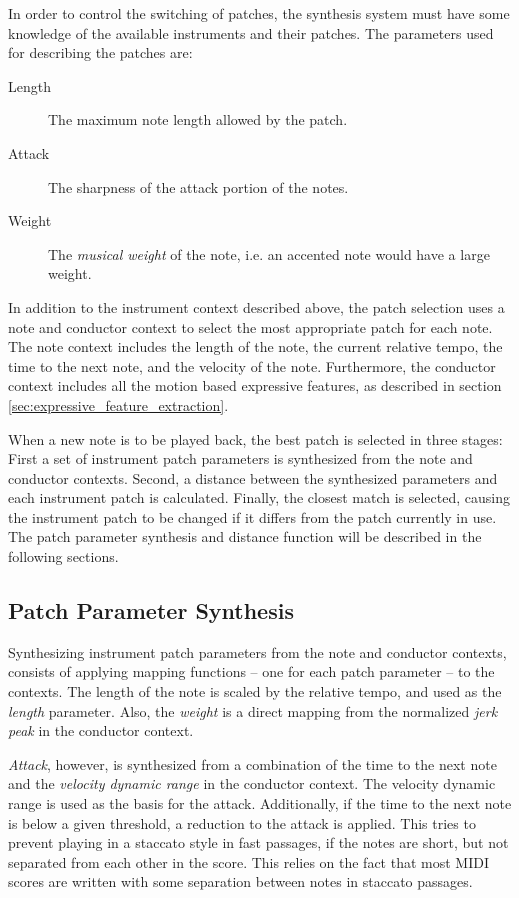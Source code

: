 In order to control the switching of patches,
the synthesis system must have some knowledge of
the available instruments and their patches.
The parameters used for describing the patches are:
\begin{description}
\item[Length] The maximum note length allowed by the patch.
\item[Attack] The sharpness of the attack portion of the notes.
\item[Weight] The \textit{musical weight} of the note, i.e. an accented note would have a large weight.
\end{description}

In addition to the instrument context described above,
the patch selection uses a note and conductor context
to select the most appropriate patch for each note.
The note context includes
the length of the note,
the current relative tempo,
the time to the next note,
and the velocity of the note.
Furthermore, the conductor context includes
all the motion based expressive features,
as described in section \ref{sec:expressive_feature_extraction}.

When a new note is to be played back,
the best patch is selected in three stages:
First a set of instrument patch parameters is
synthesized from the note and conductor contexts.
Second, a distance between the synthesized parameters
and each instrument patch is calculated.
Finally, the closest match is selected,
causing the instrument patch to be changed
if it differs from the patch currently in use.
The patch parameter synthesis and distance function
will be described in the following sections.

\subsection{Patch Parameter Synthesis}

Synthesizing instrument patch parameters
from the note and conductor contexts,
consists of applying mapping functions --
one for each patch parameter --
to the contexts.
The length of the note is
scaled by the relative tempo,
and used as the \textit{length} parameter.
Also, the \textit{weight} is a direct mapping
from the normalized \textit{jerk peak}
in the conductor context.

\textit{Attack}, however,
is synthesized from a combination
of the time to the next note
and the \textit{velocity dynamic range}
in the conductor context.
The velocity dynamic range is used as the basis
for the attack.
Additionally, if the time to the next note is below a given threshold,
a reduction to the attack is applied.
This tries to prevent playing in a staccato style in fast passages,
if the notes are short, but not separated from each other in the score.
This relies on the fact that most MIDI scores are written
with some separation between notes in staccato passages.

